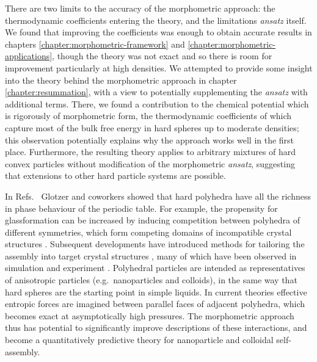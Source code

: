 \documentclass[11pt,twoside]{report}
\begin{document}
There are two limits to the accuracy of the morphometric approach: the thermodynamic coefficients entering the theory, and the limitations \emph{ansatz} itself.
We found that improving the coefficients was enough to obtain accurate results in chapters \ref{chapter:morphometric-framework} and \ref{chapter:morphometric-applications}, though the theory was not exact and so there is room for improvement particularly at high densities.
We attempted to provide some insight into the theory behind the morphometric approach in chapter \ref{chapter:resummation}, with a view to potentially supplementing the \emph{ansatz} with additional terms.
There, we found a contribution to the chemical potential which is rigorously of morphometric form, the thermodynamic coefficients of which capture most of the bulk free energy in hard spheres up to moderate densities; this observation potentially explains why the approach works well in the first place.
Furthermore, the resulting theory applies to arbitrary mixtures of hard convex particles without modification of the morphometric \emph{ansatz}, suggesting that extensions to other hard particle systems are possible.


In Refs.\ \cite{DamascenoS2012,DamascenoAN2012} Glotzer and coworkers showed that hard polyhedra have all the richness in phase behaviour of the periodic table.
For example, the propensity for glassformation can be increased by inducing competition between polyhedra of different symmetries, which form competing domains of incompatible crystal structures \cite{TeichNC2019}.
Subsequent developments have introduced methods for tailoring the assembly into target crystal structures \cite{YoungACIE2013,SchultzAN2015,VanAndersAN2015}, many of which have been observed in simulation and experiment \cite{MisztaNM2011,HenzieNM2012,QiJCP2013}.
Polyhedral particles are intended as representatives of anisotropic particles (e.g.\ nanoparticles and colloids), in the same way that hard spheres are the starting point in simple liquids.
In current theories \cite{YoungACIE2013} effective entropic forces are imagined between parallel faces of adjacent polyhedra, which becomes exact at asymptotically high pressures.
The morphometric approach thus has potential to significantly improve descriptions of these interactions, and become a quantitatively predictive theory for nanoparticle and colloidal self-assembly.
\end{document}
